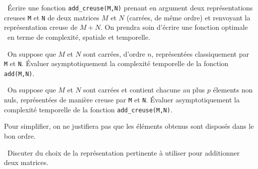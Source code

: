 \question\ \'Ecrire une fonction \texttt{add\_creuse(M,N)} prenant en argument deux représentations creuses \texttt{M} et \texttt{N} de deux matrices $M$ et $N$ (carrées, de même ordre) et renvoyant la représentation creuse de $M+N$. 
On prendra soin d'écrire une fonction \og optimale \fg\ en terme de complexité, spatiale et temporelle. 

\question\ On suppose que $M$ et $N$ sont carrées, d'ordre $n$, représentées classiquement par \texttt{M} et \texttt{N}. \'Evaluer asymptotiquement la complexité temporelle de la fonction \texttt{add(M,N)}.


\question\ On suppose que $M$ et $N$ sont carrées et contient chacune au plus $p$ élements non nuls, représentées de manière creuse par \texttt{M} et \texttt{N}. \'Evaluer asymptotiquement la complexité temporelle de la fonction \texttt{add\_creuse(M,N)}.

Pour simplifier, on ne justifiera pas que les éléments obtenus sont disposés dans le bon ordre. 

\question\ Discuter du choix de la représentation pertinente à utiliser pour additionner deux matrices. 